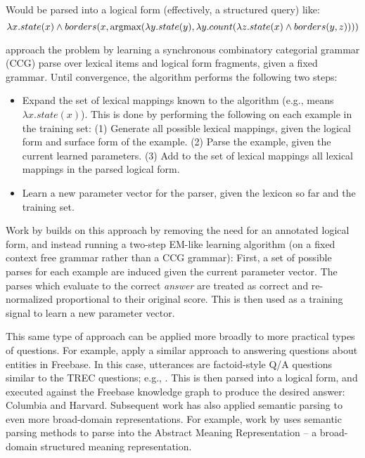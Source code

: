 \begin{displayquote}
\end{displayquote}

Would be parsed into a logical form (effectively, a structured query) like:
\begin{equation*}
\lambda x . state(x) \land borders(x, \mathop{\text{argmax}}( \lambda y . state(y), \lambda y . count (\lambda z . state(x) \land borders(y, z))))
\end{equation*}

 approach the problem by learning a synchronous
  combinatory categorial grammar (CCG) \cite{key:2004bos-ccg} 
  parse over lexical items and logical form fragments,
  given a fixed grammar.
Until convergence, the algorithm performs the following two steps:
\begin{itemize}
  \item Expand the set of lexical mappings
        known to the algorithm (e.g.,  means $\lambda x . state(x)$).
        This is done by performing the following on each example in the training set:
        (1) Generate all possible lexical mappings, given the logical form and surface
            form of the example.
        (2) Parse the example, given the current learned parameters.
        (3) Add to the set of lexical mappings all lexical mappings in the parsed
            logical form.
  \item Learn a new parameter vector for the parser, given the lexicon so far and the
        training set.
\end{itemize}

Work by  builds on this approach by removing the need for
  an annotated logical form, and instead running a two-step EM-like learning algorithm
  (on a fixed context free grammar rather than a CCG grammar):
First, a set of possible parses for each example are induced given the current parameter vector.
The parses which evaluate to the correct \textit{answer} are treated as correct and re-normalized
  proportional to their original score.
This is then used as a training signal to learn a new parameter vector.

This same type of approach can be applied more broadly to more practical types of questions.
For example,  apply a similar approach to answering
  questions about entities in Freebase.
In this case, utterances are factoid-style Q/A questions similar to the TREC questions;
  e.g., .
This is then parsed into a logical form, and executed against the Freebase knowledge graph
  to produce the desired answer: Columbia and Harvard.
Subsequent work has also applied semantic parsing to even more broad-domain representations.
For example, work by  uses semantic parsing methods to parse into
  the Abstract Meaning Representation \cite{key:2013banarescu-amr} -- a 
  broad-domain structured meaning representation.

